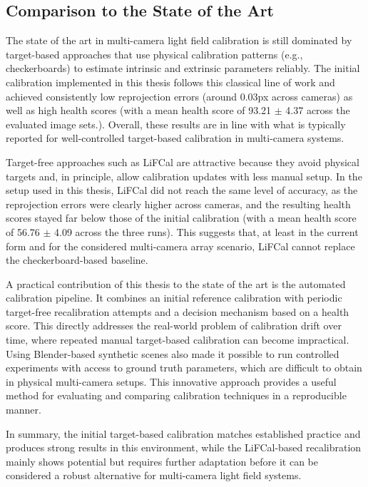 \documentclass[12pt]{scrartcl}
\begin{document}
\subsection{Comparison to the State of the Art}

The state of the art in multi-camera light field calibration is still dominated by target-based approaches that use physical calibration patterns (e.g., checkerboards) to estimate intrinsic and extrinsic parameters reliably. The initial calibration implemented in this thesis follows this classical line of work and achieved consistently low reprojection errors (around $0.03$px across cameras) as well as high health scores (with a mean health score of 93.21 $\pm$ 4.37 across the evaluated image sets.). Overall, these results are in line with what is typically reported for well-controlled target-based calibration in multi-camera systems.
\newline

Target-free approaches such as LiFCal are attractive because they avoid physical targets and, in principle, allow calibration updates with less manual setup. In the setup used in this thesis, LiFCal did not reach the same level of accuracy, as the reprojection errors were clearly higher across cameras, and the resulting health scores stayed far below those of the initial calibration (with a mean health score of 56.76 $\pm$ 4.09  across the three runs). This suggests that, at least in the current form and for the considered multi-camera array scenario, LiFCal cannot replace the checkerboard-based baseline.
\newline

A practical contribution of this thesis to the state of the art is the automated calibration pipeline. It combines an initial reference calibration with periodic target-free recalibration attempts and a decision mechanism based on a health score. This directly addresses the real-world problem of calibration drift over time, where repeated manual target-based calibration can become impractical. Using Blender-based synthetic scenes also made it possible to run controlled experiments with access to ground truth parameters, which are difficult to obtain in physical multi-camera setups. This innovative approach provides a useful method for evaluating and comparing calibration techniques in a reproducible manner.
\newline

In summary, the initial target-based calibration matches established practice and produces strong results in this environment, while the LiFCal-based recalibration mainly shows potential but requires further adaptation before it can be considered a robust alternative for multi-camera light field systems. 
\end{document}

